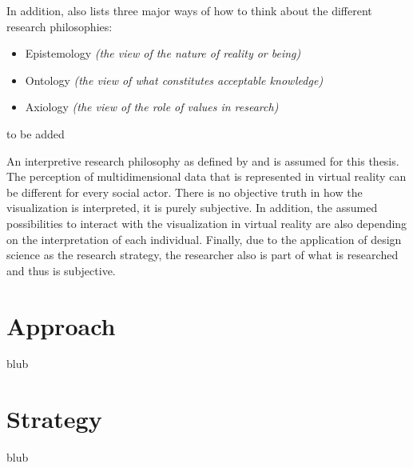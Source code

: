 In addition, \cite{Saunders2009} also lists three major ways of how to think about the different research philosophies:
\begin{itemize}[noitemsep,nolistsep]
	\item Epistemology \textit{(the view of the nature of reality or being)}
	\item Ontology \textit{(the view of what constitutes acceptable knowledge)}
	\item Axiology \textit{(the view of the role of values in research)}
\end{itemize}



to be added



An interpretive research philosophy as defined by \cite{Vaishnavi2007} and \cite{Saunders2009} is assumed for this thesis.
The perception of multidimensional data that is represented in virtual reality can be different for every social actor. There is no objective truth in how the visualization is interpreted, it is purely subjective. In addition, the assumed possibilities to interact with the visualization in virtual reality are also depending on the interpretation of each individual. Finally, due to the application of design science as the research strategy, the researcher also is part of what is researched and thus is subjective.



\section{Approach}

blub



\section{Strategy}

blub




